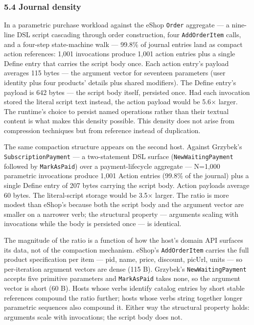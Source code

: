 \documentclass[
]{article}
\newcounter{none} %
\let\origtexttt\texttt%
\renewcommand{\texttt}[1]{\origtexttt{\seqsplit{#1}}}%
\let\texttt\origtexttt%
\begin{document}
\subsubsection{5.4 Journal density}\label{journal-density}

In a parametric purchase workload against the eShop \texttt{Order}
aggregate --- a nine-line DSL script cascading through order
construction, four \texttt{AddOrderItem} calls, and a four-step
state-machine walk --- 99.8\% of journal entries land as compact action
references: 1,001 invocations produce 1,001 action entries plus a single
Define entry that carries the script body once. Each action entry's
payload averages 115 bytes --- the argument vector for seventeen
parameters (user identity plus four products' details plus shared
modifiers). The Define entry's payload is 642 bytes --- the script body
itself, persisted once. Had each invocation stored the literal script
text instead, the action payload would be 5.6× larger. The runtime's
choice to persist named operations rather than their textual content is
what makes this density possible. This density does not arise from
compression techniques but from reference instead of duplication.

The same compaction structure appears on the second host. Against
Grzybek's \texttt{SubscriptionPayment} --- a two-statement DSL surface
(\texttt{NewWaitingPayment} followed by \texttt{MarkAsPaid}) over a
payment-lifecycle aggregate --- N=1,000 parametric invocations produce
1,001 Action entries (99.8\% of the journal) plus a single Define entry
of 207 bytes carrying the script body. Action payloads average 60 bytes.
The literal-script storage would be 3.5× larger. The ratio is more
modest than eShop's because both the script body and the argument vector
are smaller on a narrower verb; the structural property --- arguments
scaling with invocations while the body is persisted once --- is
identical.

The magnitude of the ratio is a function of how the host's domain API
surfaces its data, not of the compaction mechanism. eShop's
\texttt{AddOrderItem} carries the full product specification per item
--- pid, name, price, discount, picUrl, units --- so per-iteration
argument vectors are dense (115 B). Grzybek's \texttt{NewWaitingPayment}
accepts five primitive parameters and \texttt{MarkAsPaid} takes none, so
the argument vector is short (60 B). Hosts whose verbs identify catalog
entries by short stable references compound the ratio further; hosts
whose verbs string together longer parametric sequences also compound
it. Either way the structural property holds: arguments scale with
invocations; the script body does not.
\end{document}
